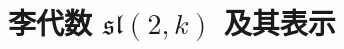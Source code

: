 \section{\texorpdfstring{李代数 \(\mathfrak{sl}(2,k)\) 及其表示}{李代数 \textbackslash mathfrak\{sl\}(2,k) 及其表示}}

